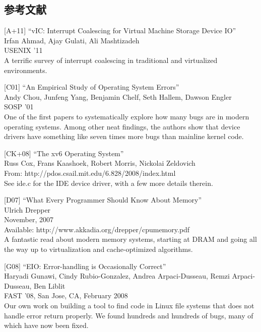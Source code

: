 \hypertarget{ux53c2ux8003ux6587ux732e-23}{%
\subsection*{参考文献}\label{ux53c2ux8003ux6587ux732e-23}}

{[}A+11{]} ``vIC: Interrupt Coalescing for Virtual Machine Storage
Device IO''\\
Irfan Ahmad, Ajay Gulati, Ali Mashtizadeh\\
USENIX '11\\
A terrific survey of interrupt coalescing in traditional and virtualized
environments.

{[}C01{]} ``An Empirical Study of Operating System Errors''\\
Andy Chou, Junfeng Yang, Benjamin Chelf, Seth Hallem, Dawson Engler\\
SOSP '01\\
One of the first papers to systematically explore how many bugs are in
modern operating systems. Among other neat findings, the authors show
that device drivers have something like seven times more bugs than
mainline kernel code.

{[}CK+08{]} ``The xv6 Operating System''\\
Russ Cox, Frans Kaashoek, Robert Morris, Nickolai Zeldovich\\
From: http://pdos.csail.mit.edu/6.828/2008/index.html\\
See ide.c for the IDE device driver, with a few more details therein.

{[}D07{]} ``What Every Programmer Should Know About Memory''\\
Ulrich Drepper\\
November, 2007\\
Available: http://www.akkadia.org/drepper/cpumemory.pdf\\
A fantastic read about modern memory systems, starting at DRAM and going
all the way up to virtualization and cache-optimized algorithms.

{[}G08{]} ``EIO: Error-handling is Occasionally Correct''\\
Haryadi Gunawi, Cindy Rubio-Gonzalez, Andrea Arpaci-Dusseau, Remzi
Arpaci-Dusseau, Ben Liblit\\
FAST '08, San Jose, CA, February 2008\\
Our own work on building a tool to find code in Linux file systems that
does not handle error return properly. We found hundreds and hundreds of
bugs, many of which have now been fixed.

